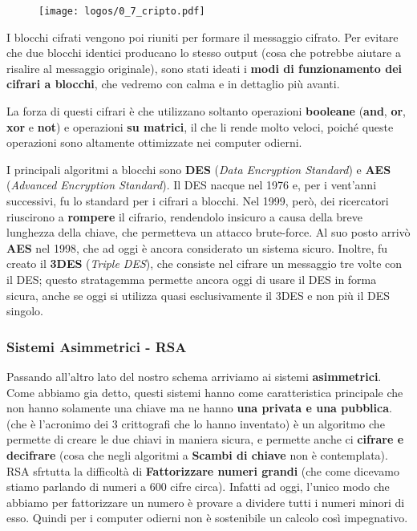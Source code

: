 \documentclass{report}
\begin{document}
\begin{figure}[h]
    \centering
    \texttt{[image: logos/0\_7\_cripto.pdf]}
\end{figure}

I blocchi cifrati vengono poi riuniti per formare il messaggio cifrato. Per evitare che due blocchi identici producano lo stesso output (cosa che potrebbe aiutare a risalire al messaggio originale), sono stati ideati i \textbf{modi di funzionamento dei cifrari a blocchi}, che vedremo con calma e in dettaglio più avanti.

\newpage

La forza di questi cifrari è che utilizzano soltanto operazioni \textbf{booleane} (\textbf{and}, \textbf{or}, \textbf{xor} e \textbf{not}) e operazioni \textbf{su matrici}, il che li rende molto veloci, poiché queste operazioni sono altamente ottimizzate nei computer odierni.


I principali algoritmi a blocchi sono \textbf{DES} (\textit{Data Encryption Standard}) e \textbf{AES} (\textit{Advanced Encryption Standard}). Il DES nacque nel 1976 e, per i vent’anni successivi, fu lo standard per i cifrari a blocchi. Nel 1999, però, dei ricercatori riuscirono a \textbf{rompere} il cifrario, rendendolo insicuro a causa della breve lunghezza della chiave, che permetteva un attacco brute-force. Al suo posto arrivò \textbf{AES} nel 1998, che ad oggi è ancora considerato un sistema sicuro. Inoltre, fu creato il \textbf{3DES} (\textit{Triple DES}), che consiste nel cifrare un messaggio tre volte con il DES; questo stratagemma permette ancora oggi di usare il DES in forma sicura, anche se oggi si utilizza quasi esclusivamente il 3DES e non più il DES singolo.


\subsubsection{Sistemi Asimmetrici - RSA}

Passando all'altro lato del nostro schema arriviamo ai sistemi \textbf{asimmetrici}. Come abbiamo gia detto, questi sistemi hanno come caratteristica principale che non hanno solamente una chiave ma ne hanno \textbf{una privata e una pubblica}.  (che è l'acronimo dei 3 crittografi che lo hanno inventato) è un algoritmo che permette di creare le due chiavi in maniera sicura, e permette anche ci \textbf{cifrare e decifrare} (cosa che negli algoritmi a \textbf{Scambi di chiave} non è contemplata). RSA sfrtutta la difficoltà di \textbf{Fattorizzare numeri grandi} (che come dicevamo stiamo parlando di numeri a 600 cifre circa). Infatti ad oggi, l'unico modo che abbiamo per fattorizzare un numero è provare a dividere tutti i numeri minori di esso. Quindi per i computer odierni non è sostenibile un calcolo così impegnativo.  
\end{document}
